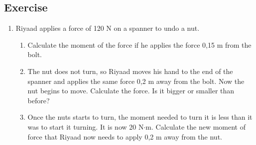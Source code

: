 \subsection{Exercise}
\begin{enumerate}
\item {Riyaad applies a force of 120 N on a spanner to undo a nut.
	\begin{enumerate}
	\item Calculate the moment of the force if he applies the force 0,15 m from the bolt.
	\item The nut does not turn, so Riyaad moves his hand to the end of the spanner and applies the same force 0,2 m away from the bolt. Now the nut begins to move. Calculate the force. Is it bigger or smaller than before? 
	\item Once the nuts starts to turn, the moment needed to turn it is less than it was to start it turning. It is now 20 N$\cdot$m. Calculate the new moment of force that Riyaad now needs to apply 0,2 m away from the nut.
	\end{enumerate}}


\end{enumerate}
